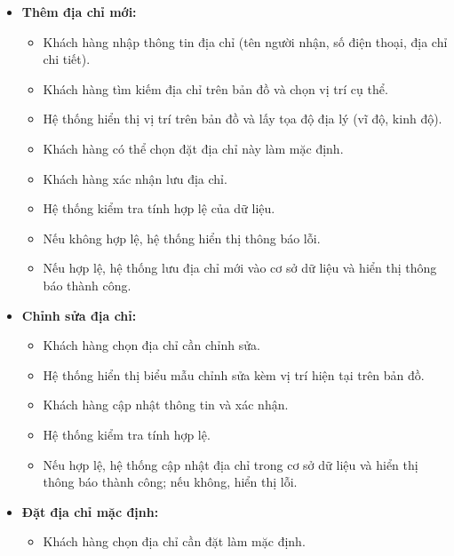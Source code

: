\begin{itemize}
    \item \textbf{Thêm địa chỉ mới:}
    \begin{itemize}
        \item Khách hàng nhập thông tin địa chỉ (tên người nhận, số điện thoại, địa chỉ chi tiết).
        
        \item Khách hàng tìm kiếm địa chỉ trên bản đồ và chọn vị trí cụ thể.
        
        \item Hệ thống hiển thị vị trí trên bản đồ và lấy tọa độ địa lý (vĩ độ, kinh độ).
        
        \item Khách hàng có thể chọn đặt địa chỉ này làm mặc định.
        
        \item Khách hàng xác nhận lưu địa chỉ.
        
        \item Hệ thống kiểm tra tính hợp lệ của dữ liệu.
        
        \item Nếu không hợp lệ, hệ thống hiển thị thông báo lỗi.
        
        \item Nếu hợp lệ, hệ thống lưu địa chỉ mới vào cơ sở dữ liệu và hiển thị thông báo thành công.
    \end{itemize}
    
    \item \textbf{Chỉnh sửa địa chỉ:}
    \begin{itemize}
        \item Khách hàng chọn địa chỉ cần chỉnh sửa.
        
        \item Hệ thống hiển thị biểu mẫu chỉnh sửa kèm vị trí hiện tại trên bản đồ.
        
        \item Khách hàng cập nhật thông tin và xác nhận.
        
        \item Hệ thống kiểm tra tính hợp lệ.
        
        \item Nếu hợp lệ, hệ thống cập nhật địa chỉ trong cơ sở dữ liệu và hiển thị thông báo thành công; nếu không, hiển thị lỗi.
    \end{itemize}
    
    \item \textbf{Đặt địa chỉ mặc định:}
    \begin{itemize}
        \item Khách hàng chọn địa chỉ cần đặt làm mặc định.
        

\end{itemize}
\end{itemize}

